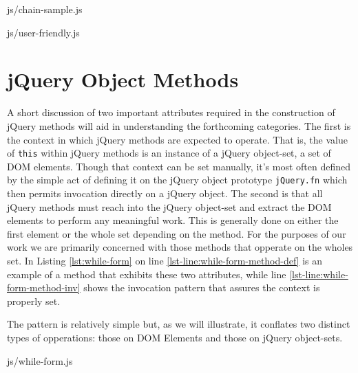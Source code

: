 \documentclass[preprint, leqno]{sigplanconf}
\begin{document}
\begin{bottom}
\begin{lstinputlisting}[
    language=JavaScript,
    caption={Sample method chain},
    label={lst:chain-sample}
]{js/chain-sample.js}
\end{lstinputlisting}

\begin{lstinputlisting}[
    language=JavaScript,
    caption={User friendly overhead},
    label={lst:user-friendly}
]{js/user-friendly.js}
\end{lstinputlisting}
\end{bottom}

\section{jQuery Object Methods}

A short discussion of two important attributes required in the construction of jQuery methods will aid in understanding the forthcoming categories. The first is the context in which jQuery methods are expected to operate. That is, the value of \verb|this| within jQuery methods is an instance of a jQuery object-set, a set of DOM elements. Though that context can be set manually, it's most often defined by the simple act of defining it on the jQuery object prototype \verb|jQuery.fn| which then permits invocation directly on a jQuery object. The second is that all jQuery methods must reach into the jQuery object-set and extract the DOM elements to perform any meaningful work. This is generally done on either the first element or the whole set depending on the method. For the purposes of our work we are primarily concerned with those methods that opperate on the wholes set. In Listing \ref{lst:while-form} on line \ref{lst-line:while-form-method-def} is an example of a method that exhibits these two attributes, while line \ref{lst-line:while-form-method-inv} shows the invocation pattern that assures the context is properly set.

The pattern is relatively simple but, as we will illustrate, it conflates two distinct types of opperations: those on DOM Elements and those on jQuery object-sets.

\begin{top}
\begin{lstinputlisting}[
    language=JavaScript,
    caption={Sample jQuery method},
    label={lst:while-form},
    escapeinside={@}{@}
]{js/while-form.js}
\end{lstinputlisting}
\end{top}
\end{document}
